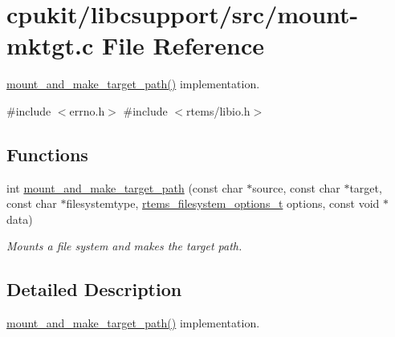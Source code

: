 \hypertarget{mount-mktgt_8c}{}\section{cpukit/libcsupport/src/mount-\/mktgt.c File Reference}
\label{mount-mktgt_8c}


\mbox{\hyperlink{group__FileSystemTypesAndMount_ga27af6440b4ef795576c94e870c5d997f}{mount\+\_\+and\+\_\+make\+\_\+target\+\_\+path()}} implementation.  


{\ttfamily \#include $<$errno.\+h$>$}\newline
{\ttfamily \#include $<$rtems/libio.\+h$>$}\newline
\subsection*{Functions}
\begin{DoxyCompactItemize}
\item 
int \mbox{\hyperlink{group__FileSystemTypesAndMount_ga27af6440b4ef795576c94e870c5d997f}{mount\+\_\+and\+\_\+make\+\_\+target\+\_\+path}} (const char $\ast$source, const char $\ast$target, const char $\ast$filesystemtype, \mbox{\hyperlink{group__FileSystemTypesAndMount_gabb3a23ee6b6e7aacb719a1a81716af7a}{rtems\+\_\+filesystem\+\_\+options\+\_\+t}} options, const void $\ast$data)
\begin{DoxyCompactList}\small\item\em Mounts a file system and makes the {\itshape target} path. \end{DoxyCompactList}\end{DoxyCompactItemize}


\subsection{Detailed Description}
\mbox{\hyperlink{group__FileSystemTypesAndMount_ga27af6440b4ef795576c94e870c5d997f}{mount\+\_\+and\+\_\+make\+\_\+target\+\_\+path()}} implementation. 

